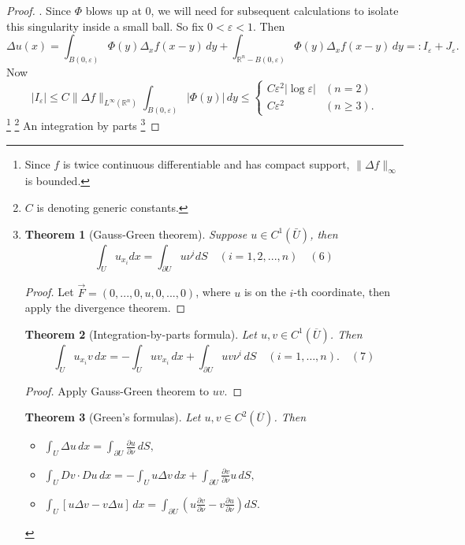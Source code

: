 \documentclass[a4paper,12pt]{report}
\newtheorem{theorem}{Theorem}[section]
\begin{document}
\begin{proof}
. Since \( \Phi \) blows up at 0, we will need for subsequent calculations to isolate this singularity inside a small ball. So fix \( 0< \varepsilon <1 \). Then
\[
\Delta u(x) = \int_{B(0, \varepsilon)} \Phi(y) \Delta_x f(x - y) \, dy + \int_{\mathbb{R}^n - B(0, \varepsilon)} \Phi(y) \Delta_x f(x - y) \, dy =: I_\varepsilon + J_\varepsilon.
\]
Now
\[
|I_\varepsilon| \leq C \| \Delta f \|_{L^\infty (\mathbb{R}^n)} \int_{B(0, \varepsilon)} |\Phi (y)| \, dy \leq
\begin{cases}
C \varepsilon^2 |\log \varepsilon| & (n = 2) \\
C \varepsilon^2 & (n \geq 3).
\end{cases}
\]
\footnote{
Since \(f\) is twice continuous differentiable and has compact support, \(\|\Delta f\|_{\infty}\) is bounded. 
}
\footnote{\(C\) is denoting generic constants. }
\newpage
\noindent
An integration by parts \footnote{
\begin{theorem}[Gauss-Green theorem]
Suppose \(u \in C^1 (\bar{U})\), then 
\[\int_{U} u_{x_i}dx = \int_{\partial U} u \nu^i dS \quad (i= 1,2,..., n) \quad (6)\]
\end{theorem}
\begin{proof}
Let \(\vec{F} = (0, ..., 0, u, 0,..., 0)\), where \(u\) is on the \(i\)-th coordinate, then apply the divergence theorem. 
\end{proof}
\begin{theorem}[Integration-by-parts formula]
Let $u, v \in C^1(\overline{U})$. Then
\[
    \int_U u_{x_i} v \, dx = -\int_U u v_{x_i} \, dx + \int_{\partial U} u v \nu^i \, dS \quad (i = 1, \dots, n). \quad (7)
\]
\end{theorem}
\begin{proof}
Apply Gauss-Green theorem to $uv$.
\end{proof}
\begin{theorem}[Green's formulas]
Let $u, v \in C^2(\overline{U})$. Then
\begin{itemize}
    \item[(i)] $\displaystyle \int_U \Delta u \, dx = \int_{\partial U} \frac{\partial u}{\partial \nu} \, dS,$
    \item[(ii)] $\displaystyle \int_U Dv \cdot Du \, dx = -\int_U u \Delta v \, dx + \int_{\partial U} \frac{\partial v}{\partial \nu} u \, dS,$
    \item[(iii)] $\displaystyle \int_U [u \Delta v - v \Delta u ]\, dx = \int_{\partial U} \left( u \frac{\partial v}{\partial \nu} - v \frac{\partial u}{\partial \nu} \right) dS.$
\end{itemize}

\end{theorem}}
\end{proof}
\end{document}

